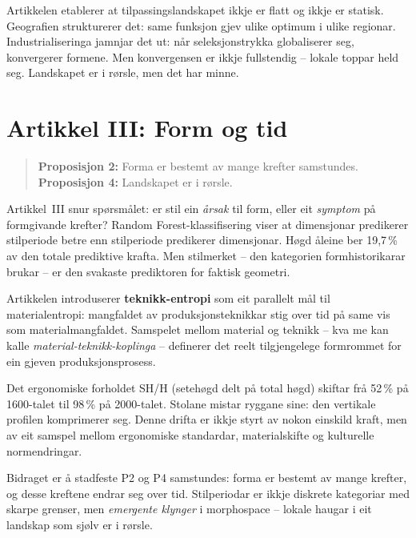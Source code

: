\documentclass[12pt,a4paper,oneside]{report}
\begin{document}
Artikkelen etablerer at tilpassingslandskapet ikkje er flatt og ikkje er statisk. Geografien strukturerer det: same funksjon gjev ulike optimum i ulike regionar. Industrialiseringa jamnjar det ut: når seleksjonstrykka globaliserer seg, konvergerer formene. Men konvergensen er ikkje fullstendig -- lokale toppar held seg. Landskapet er i rørsle, men det har minne.

\section{Artikkel III: Form og tid}
\label{sec:art3}

\begin{quote}
\textbf{Proposisjon 2:} Forma er bestemt av mange krefter samstundes.\\
\textbf{Proposisjon 4:} Landskapet er i rørsle.
\end{quote}

Artikkel~III snur spørsmålet: er stil ein \emph{årsak} til form, eller eit \emph{symptom} på formgivande krefter? Random Forest-klassifisering viser at dimensjonar predikerer stilperiode betre enn stilperiode predikerer dimensjonar. Høgd åleine ber 19,7\,\% av den totale prediktive krafta. Men stilmerket -- den kategorien formhistorikarar brukar -- er den svakaste prediktoren for faktisk geometri.

Artikkelen introduserer \textbf{teknikk-entropi} som eit parallelt mål til materialentropi: mangfaldet av produksjonsteknikkar stig over tid på same vis som materialmangfaldet. Samspelet mellom material og teknikk -- kva me kan kalle \emph{material-teknikk-koplinga} -- definerer det reelt tilgjengelege formrommet for ein gjeven produksjonsprosess.

Det ergonomiske forholdet SH/H (setehøgd delt på total høgd) skiftar frå 52\,\% på 1600-talet til 98\,\% på 2000-talet. Stolane mistar ryggane sine: den vertikale profilen komprimerer seg. Denne drifta er ikkje styrt av nokon einskild kraft, men av eit samspel mellom ergonomiske standardar, materialskifte og kulturelle normendringar.

Bidraget er å stadfeste P2 og P4 samstundes: forma er bestemt av mange krefter, og desse kreftene endrar seg over tid. Stilperiodar er ikkje diskrete kategoriar med skarpe grenser, men \emph{emergente klynger} i morphospace -- lokale haugar i eit landskap som sjølv er i rørsle.

\end{document}
